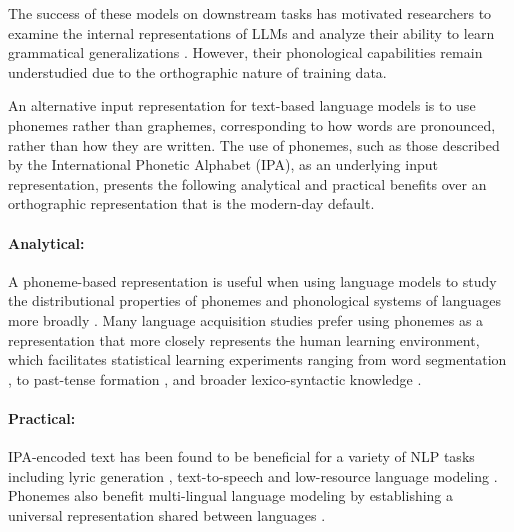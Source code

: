  The success of these models on downstream tasks has motivated researchers to examine the internal representations of LLMs and analyze their ability to learn grammatical generalizations \citep{hewitt-manning-2019-structural, hu-etal-2020-systematic, manning-2020-emergent}. However, their phonological capabilities remain understudied due to the orthographic nature of training data.



An alternative input representation for text-based language models is to use phonemes rather than graphemes, corresponding to how words are pronounced, rather than how they are written. The use of phonemes, such as those described by the International Phonetic Alphabet (IPA), as an underlying input representation, presents the following analytical and practical benefits over an orthographic representation that is the modern-day default.

\paragraph{Analytical:} A phoneme-based representation is useful when using language models to study the distributional properties of phonemes \citep{mayer-2020-phonology-distribution} and phonological systems of languages more broadly \citep{eden-2018-phonological-distance}. Many language acquisition studies prefer using phonemes as a representation that more closely represents the human learning environment, which facilitates statistical learning experiments ranging from word segmentation \citep{Coltekin2017}, to past-tense formation \citep{kirov-2018-recurrent}, and broader lexico-syntactic knowledge \citep{lavechin}.

\paragraph{Practical:} IPA-encoded text has been found to be beneficial for a variety of NLP tasks including lyric generation \citep{ding-2024-songcomposer}, text-to-speech \citep{sundararaman-2021-phonemebert, li-2023-phoneme-level-bert} and low-resource language modeling \citep{leong-whitenack-2022-phone}. Phonemes also benefit multi-lingual language modeling by establishing a universal representation shared between languages \citep{feng-2023-language-universal-phonetic, zhu-etal-2024-taste}. 

